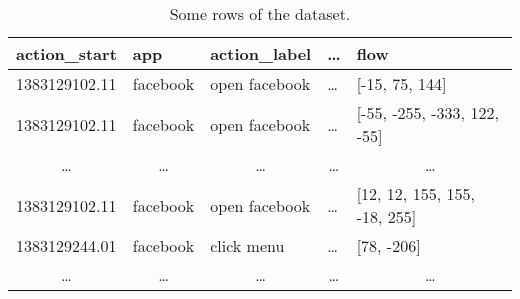 \begin{table}[]
\begin{tabular}{@{}lllll@{}}
\toprule
\textbf{action\_start}      & \textbf{app}               & \textbf{action\_label}     & \textbf{\dots}             & \textbf{flow}                \\ \midrule
1383129102.11              & facebook                   & open facebook              & \dots                      & [-15, 75, 144]               \\
1383129102.11              & facebook                   & open facebook              & \dots                      & [-55, -255, -333, 122, -55]  \\
\multicolumn{1}{c}{\dots} & \multicolumn{1}{c}{\dots} & \multicolumn{1}{c}{\dots} & \multicolumn{1}{c}{\dots} & \multicolumn{1}{c}{\dots}   \\
1383129102.11              & facebook                   & open facebook              & \dots                      & [12, 12, 155, 155, -18, 255] \\
1383129244.01              & facebook                   & click menu                 & \dots                      & [78, -206]                   \\
\multicolumn{1}{c}{\dots} & \multicolumn{1}{c}{\dots} & \multicolumn{1}{c}{\dots} & \multicolumn{1}{c}{\dots} & \multicolumn{1}{c}{\dots}   \\ \bottomrule
\end{tabular}
\caption{\small{Some rows of the dataset.}}
\label{tab:origdataset}
\end{table}
